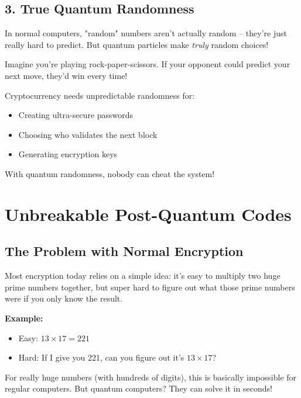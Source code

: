 \documentclass[11pt,a4paper]{article}
\begin{document}
\subsection{3. True Quantum Randomness}

In normal computers, "random" numbers aren't actually random -- they're just really hard to predict. But quantum particles make \textit{truly} random choices!

\begin{tcolorbox}[colback=energyred!10,colframe=energyred,title=\textbf{Why True Randomness Matters}]
Imagine you're playing rock-paper-scissors. If your opponent could predict your next move, they'd win every time!

Cryptocurrency needs unpredictable randomness for:
\begin{itemize}
    \item Creating ultra-secure passwords
    \item Choosing who validates the next block
    \item Generating encryption keys
\end{itemize}

With quantum randomness, nobody can cheat the system!
\end{tcolorbox}

\section{Unbreakable Post-Quantum Codes}

\subsection{The Problem with Normal Encryption}

Most encryption today relies on a simple idea: it's easy to multiply two huge prime numbers together, but super hard to figure out what those prime numbers were if you only know the result.

\textbf{Example:}
\begin{itemize}
    \item Easy: $13 \times 17 = 221$
    \item Hard: If I give you 221, can you figure out it's $13 \times 17$?
\end{itemize}

For really huge numbers (with hundreds of digits), this is basically impossible for regular computers. But quantum computers? They can solve it in seconds!
\end{document}
